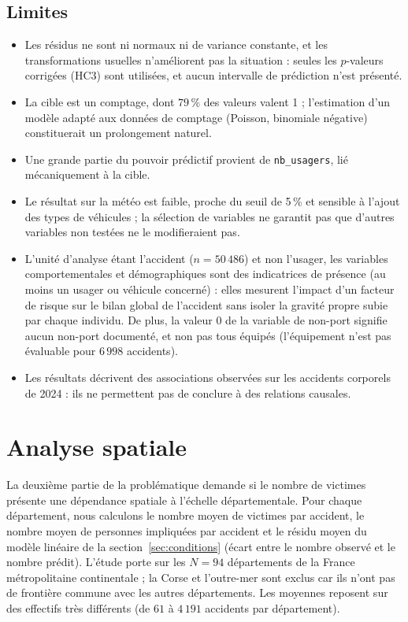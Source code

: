 \documentclass[11pt,a4paper]{article}
\begin{document}
\subsection{Limites}
\begin{itemize}
    \item Les résidus ne sont ni normaux ni de variance constante, et les transformations usuelles n'améliorent pas la situation : seules les $p$-valeurs corrigées (HC3) sont utilisées, et aucun intervalle de prédiction n'est présenté.
    \item La cible est un comptage, dont $79\,\%$ des valeurs valent 1 ; l'estimation d'un modèle adapté aux données de comptage (Poisson, binomiale négative) constituerait un prolongement naturel.
    \item Une grande partie du pouvoir prédictif provient de \texttt{nb\_usagers}, lié mécaniquement à la cible.
    \item Le résultat sur la météo est faible, proche du seuil de 5\,\% et sensible à l'ajout des types de véhicules ; la sélection de variables ne garantit pas que d'autres variables non testées ne le modifieraient pas.
    \item L'unité d'analyse étant l'accident ($n = 50\,486$) et non l'usager, les variables comportementales et démographiques sont des indicatrices de présence (\og au moins un usager ou véhicule concerné\fg{}) : elles mesurent l'impact d'un facteur de risque sur le bilan global de l'accident sans isoler la gravité propre subie par chaque individu. De plus, la valeur 0 de la variable de non-port signifie \og aucun non-port documenté\fg{}, et non pas \og tous équipés\fg{} (l'équipement n'est pas évaluable pour $6\,998$ accidents).
    \item Les résultats décrivent des associations observées sur les accidents corporels de 2024 : ils ne permettent pas de conclure à des relations causales.
\end{itemize}
\section{Analyse spatiale}\label{sec:spatial}

La deuxième partie de la problématique demande si le nombre de victimes présente une dépendance spatiale à l'échelle départementale. Pour chaque département, nous calculons le nombre moyen de victimes par accident, le nombre moyen de personnes impliquées par accident et le résidu moyen du modèle linéaire de la section~\ref{sec:conditions} (écart entre le nombre observé et le nombre prédit). L'étude porte sur les $N = 94$ départements de la France métropolitaine continentale ; la Corse et l'outre-mer sont exclus car ils n'ont pas de frontière commune avec les autres départements. Les moyennes reposent sur des effectifs très différents (de $61$ à $4\,191$ accidents par département).
\end{document}
